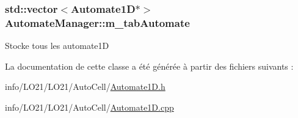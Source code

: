 \subsubsection[{\texorpdfstring{m\+\_\+tab\+Automate}{m_tabAutomate}}]{\setlength{\rightskip}{0pt plus 5cm}std\+::vector$<${\bf Automate1D}$\ast$$>$ Automate\+Manager\+::m\+\_\+tab\+Automate\hspace{0.3cm}{\ttfamily [private]}}\hypertarget{class_automate_manager_a0074ef7d42f91a9c9bfc14f85e09947b}{}\label{class_automate_manager_a0074ef7d42f91a9c9bfc14f85e09947b}
Stocke tous les automate1D 

La documentation de cette classe a été générée à partir des fichiers suivants \+:\begin{DoxyCompactItemize}
\item 
info/\+L\+O21/\+L\+O21/\+Auto\+Cell/\hyperlink{_automate1_d_8h}{Automate1\+D.\+h}\item 
info/\+L\+O21/\+L\+O21/\+Auto\+Cell/\hyperlink{_automate1_d_8cpp}{Automate1\+D.\+cpp}\end{DoxyCompactItemize}
